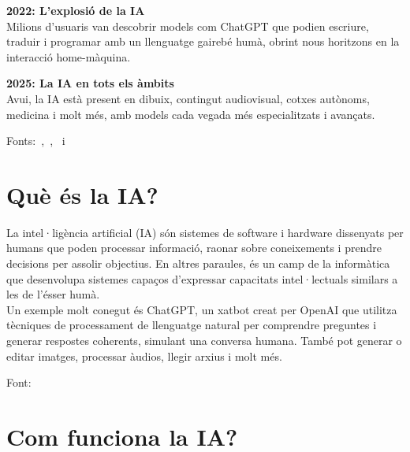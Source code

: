 \begin{enumerate}
    \textbf{2022: L'explosió de la IA}\\
    Milions d'usuaris van descobrir models com ChatGPT que podien escriure, traduir i programar amb un llenguatge gairebé humà, obrint nous horitzons en la interacció home-màquina.

    \textbf{2025: La IA en tots els àmbits}\\
    Avui, la IA està present en dibuix, contingut audiovisual, cotxes autònoms, medicina i molt més, amb models cada vegada més especialitzats i avançats.
\end{enumerate}

Fonts:~\cite{McCarthy_Minsky_Rochester_Shannon_2006},~\cite{deepblue},~\cite{chatGPT2022} i~\cite{10.1093/mind/LIX.236.433}

\section{Què és la IA?}

La intel·ligència artificial (IA) són sistemes de software i hardware dissenyats per humans que poden processar informació, raonar sobre coneixements i prendre decisions per assolir objectius. En altres paraules, és un camp de la informàtica que desenvolupa sistemes capaços d’expressar capacitats intel·lectuals similars a les de l’ésser humà.\\

Un exemple molt conegut és ChatGPT, un xatbot creat per OpenAI \cite{OpenAI} que utilitza tècniques de processament de llenguatge natural per comprendre preguntes i generar respostes coherents, simulant una conversa humana. També pot generar o editar imatges, processar àudios, llegir arxius i molt més.
\par Font: \cite{QueÉsLaIA}
\clearpage
\section{Com funciona la IA?}

